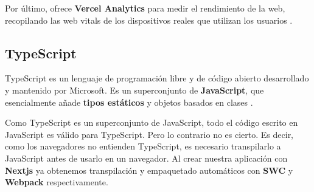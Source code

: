 \documentclass[12pt,twoside,titlepage]{report}
\begin{document}
Por último, ofrece \textbf{Vercel Analytics} para medir el rendimiento de la web, recopilando las web vitals de los dispositivos reales que utilizan los usuarios \cite{vercelAnalytics}.

\subsection{TypeScript}
\label{sec:TypeScript}

TypeScript es un lenguaje de programación libre y de código abierto desarrollado y mantenido por Microsoft. Es un superconjunto de \textbf{JavaScript}, que esencialmente añade \textbf{tipos estáticos} y objetos basados en clases \cite{typescript}.

Como TypeScript es un superconjunto de JavaScript, todo el código escrito en JavaScript es válido para TypeScript. Pero lo contrario no es cierto. Es decir, como los navegadores no entienden TypeScript, es necesario transpilarlo a JavaScript antes de usarlo en un navegador. Al crear nuestra aplicación con \textbf{Nextjs} ya obtenemos transpilación y empaquetado automáticos con \textbf{SWC} y \textbf{Webpack} respectivamente.
\end{document}
